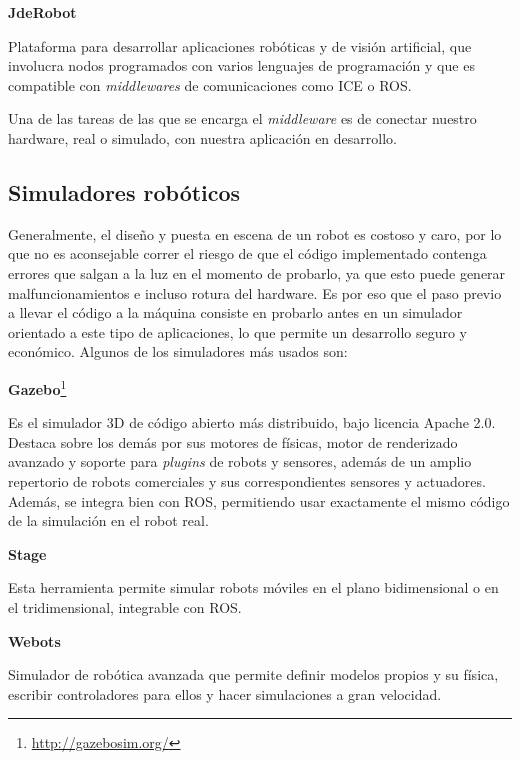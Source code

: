 	\textbf{JdeRobot}
	
Plataforma para desarrollar aplicaciones robóticas y de visión artificial, que involucra nodos programados con varios lenguajes de programación y que es compatible con \textit{middlewares} de comunicaciones como ICE o ROS.

\vspace{1cm}
Una de las tareas de las que se encarga el \textit{middleware} es de conectar nuestro hardware, real o simulado, con nuestra aplicación en desarrollo.

\subsection{Simuladores robóticos}
Generalmente, el diseño y puesta en escena de un robot es costoso y caro, por lo que no es aconsejable correr el riesgo de que el código implementado contenga errores que salgan a la luz en el momento de probarlo, ya que esto puede generar malfuncionamientos e incluso rotura del hardware. Es por eso que el paso previo a llevar el código a la máquina consiste en probarlo antes en un simulador orientado a este tipo de aplicaciones, lo que permite un desarrollo seguro y económico. Algunos de los simuladores más usados son:

	\textbf{Gazebo}\footnote{\url{http://gazebosim.org/}}
	
Es el simulador 3D de código abierto más distribuido, bajo licencia Apache 2.0. Destaca sobre los demás por sus motores de físicas, motor de renderizado avanzado y soporte para \textit{plugins} de robots y sensores, además de un amplio repertorio de robots comerciales y sus correspondientes sensores y actuadores. Además, se integra bien con ROS, permitiendo usar exactamente el mismo código de la simulación en el robot real.

	\textbf{Stage}
	
Esta herramienta permite simular robots móviles en el plano bidimensional o en el tridimensional, integrable con ROS.

	\textbf{Webots}
	
Simulador de robótica avanzada que permite definir modelos propios y su física, escribir controladores para ellos y hacer simulaciones a gran velocidad. 

